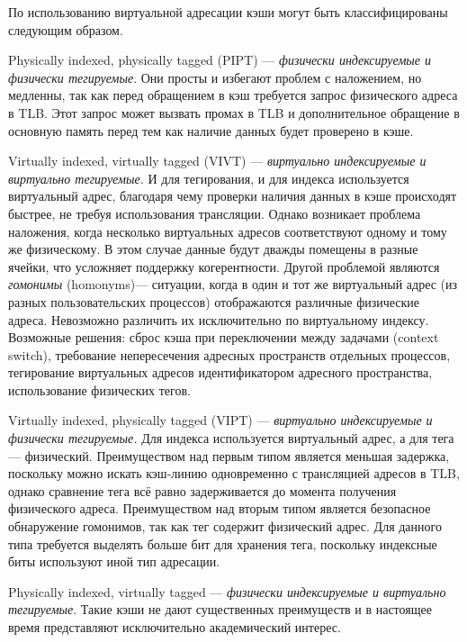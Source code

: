 По использованию виртуальной адресации кэши могут быть классифицированы следующим образом. 
\begin{enumerate*}
\item Physically indexed, physically tagged (PIPT) — \textit{физически индексируемые и физически тегируемые}. Они просты и избегают проблем с наложением, но медленны, так как перед обращением в кэш требуется запрос физического адреса в TLB. Этот запрос может вызвать промах в TLB и дополнительное обращение в основную память перед тем как наличие данных будет проверено в кэше.

\item Virtually indexed, virtually tagged (VIVT) — \textit{виртуально индексируемые и виртуально тегируемые.} И для тегирования, и для индекса используется виртуальный адрес, благодаря чему проверки наличия данных в кэше происходят быстрее, не требуя использования трансляции. Однако возникает проблема наложения, когда несколько виртуальных адресов соответствуют одному и тому же физическому. В этом случае данные будут дважды помещены в разные ячейки, что усложняет поддержку когерентности. Другой проблемой являются \textit{гомонимы} (\abbr homonyms)—  ситуации, когда в один и тот же виртуальный адрес (из разных пользовательских процессов) отображаются различные физические адреса. Невозможно различить их исключительно по виртуальному индексу. Возможные решения: сброс кэша при переключении между задачами (context switch), требование непересечения адресных пространств отдельных процессов, тегирование виртуальных адресов идентификатором адресного пространства, использование физических тегов.

\item Virtually indexed, physically tagged (VIPT) — \textit{виртуально индексируемые и физически тегируемые.} Для индекса используется виртуальный адрес, а для тега — физический. Преимуществом над первым типом является меньшая задержка, поскольку можно искать кэш-линию одновременно с трансляцией адресов в TLB, однако сравнение тега всё равно задерживается до момента получения физического адреса. Преимуществом над вторым типом является безопасное обнаружение гомонимов, так как тег содержит физический адрес. Для данного типа требуется выделять больше бит для хранения тега, поскольку индексные биты используют иной тип адресации.

\item Physically indexed, virtually tagged — \textit{физически индексируемые и виртуально тегируемые}. Такие кэши не дают существенных преимуществ и в настоящее время представляют исключительно академический интерес.
\end{enumerate*}

